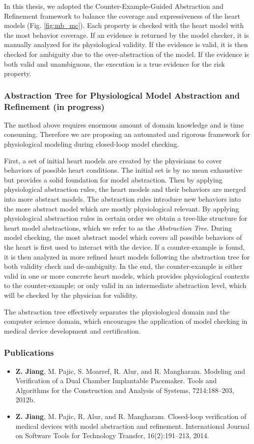 \documentclass[a4paper]{article}
\begin{document}
In this thesis, we adopted the Counter-Example-Guided Abstraction and Refinement framework to balance the coverage and expressiveness of the heart models (Fig. \ref{fig:mb_mc}).
Each property is checked with the heart model with the most behavior coverage.
If an evidence is returned by the model checker, it is manually analyzed for its physiological validity.
If the evidence is valid, it is then checked for ambiguity due to the over-abstraction of the model. 
If the evidence is both valid and unambiguous, the execution is a true evidence for the risk property.
\subsubsection{Abstraction Tree for Physiological Model Abstraction and Refinement (in progress)}
The method above requires enormous amount of domain knowledge and is time consuming.
Therefore we are proposing an automated and rigorous framework for physiological modeling during closed-loop model checking.

First, a set of initial heart models are created by the physicians to cover behaviors of possible heart conditions.
The initial set is by no mean exhaustive but provides a solid foundation for model abstraction.
Then by applying physiological abstraction rules, the heart models and their behaviors are merged into more abstract models.
The abstraction rules introduce new behaviors into the more abstract model which are mostly physiological relevant.
By applying physiological abstraction rules in certain order we obtain a tree-like structure for heart model abstractions, which we refer to as the \emph{Abstraction Tree}.
During model checking, the most abstract model which covers all possible behaviors of the heart is first used to interact with the device.
If a counter-example is found, it is then analyzed in more refined heart models following the abstraction tree for both validity check and de-ambiguity.
In the end, the counter-example is either valid in one or more concrete heart models, which provides physiological contexts to the counter-example; or only valid in an intermediate abstraction level, which will be checked by the physician for validity.

The abstraction tree effectively separates the physiological domain and the computer science domain, which encourages the application of model checking in medical device development and certification.
\subsubsection{Publications}
\begin{itemize}
\item \textbf{Z. Jiang}, M. Pajic, S. Moarref, R. Alur, and R. Mangharam. Modeling and Verification
of a Dual Chamber Implantable Pacemaker. Tools and Algorithms for the
Construction and Analysis of Systems, 7214:188–203, 2012b.
\item \textbf{Z. Jiang}, M. Pajic, R. Alur, and R. Mangharam. Closed-loop verification of medical
devices with model abstraction and refinement. International Journal on Software
Tools for Technology Transfer, 16(2):191–213, 2014.
\end{itemize}
\end{document}
